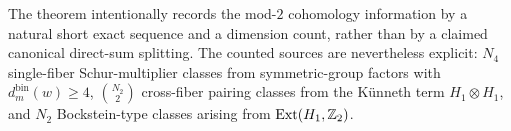 \begin{remark}\label{rem:window6-foldbin-gauge-h2-generators}
The theorem intentionally records the mod-\(2\) cohomology information by a natural short exact sequence and a dimension count, rather than by a claimed canonical direct-sum splitting.  The counted sources are nevertheless explicit: \(N_4\) single-fiber Schur-multiplier classes from symmetric-group factors with \(d^{\mathrm{bin}}_m(w)\ge 4\), \(\binom{N_2}{2}\) cross-fiber pairing classes from the K\"unneth term \(H_1\otimes H_1\), and \(N_2\) Bockstein-type classes arising from
\(
\mathrm{Ext}(H_1,\mathbb{Z}_2)
\).
\end{remark}

\endinput
